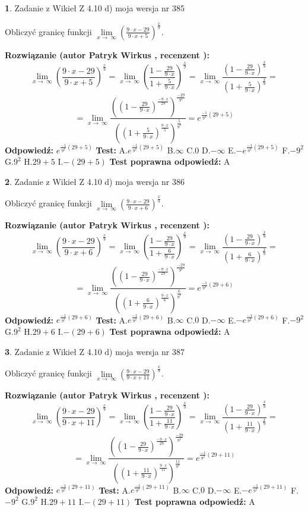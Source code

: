 \documentclass[12pt, a4paper]{article}
\theoremstyle{definition} %
\newtheorem{zad}{}
\newcommand{\zadStart}[1]{\begin{zad}#1\newline}
\newcommand{\zadStop}{\end{zad}}
\newcommand{\rozwStart}[2]{\noindent \textbf{Rozwiązanie (autor #1 , recenzent #2): }\newline}
\newcommand{\rozwStop}{\newline}
\newcommand{\odpStart}{\noindent \textbf{Odpowiedź:}\newline}
\newcommand{\odpStop}{\newline}
\newcommand{\testStart}{\noindent \textbf{Test:}\newline}
\newcommand{\testStop}{\newline}
\newcommand{\kluczStart}{\noindent \textbf{Test poprawna odpowiedź:}\newline}
\newcommand{\kluczStop}{\newline}
\begin{document}
\zadStart{Zadanie z Wikieł Z 4.10 d) moja wersja nr 385}


Obliczyć granicę funkcji  $\lim\limits_{x\to\ \infty}(\frac{9\cdot x-29}{9\cdot x+5})^{\frac{x}{9}}$.
\zadStop
\rozwStart{Patryk Wirkus}{}
$$\lim\limits_{x\to\ \infty}(\frac{9\cdot x-29}{9\cdot x+5})^{\frac{x}{9}} = \lim\limits_{x\to\ \infty}(\frac{1-\frac{29}{9\cdot x}}{1+\frac{5}{9\cdot x}})^{\frac{x}{9}}=\lim\limits_{x\to\ \infty}\frac{(1-\frac{29}{9\cdot x})^{\frac{x}{9}}}{(1+\frac{5}{9\cdot x})^{\frac{x}{9}}}=$$
$$=\lim\limits_{x\to\ \infty}\frac{((1-\frac{29}{9\cdot x})^{\frac{-9\cdot x}{29}})^{\frac{-29}{9^{2}}}}{((1+\frac{5}{9\cdot x})^{\frac{9\cdot x}{5}})^{\frac{5}{9^{2}}}}=e^{\frac{-1}{9^{2}}(29+5)}$$
\rozwStop
\odpStart
$e^{\frac{-1}{9^{2}}(29+5)}$
\odpStop
\testStart
A.$e^{\frac{-1}{9^{2}}(29+5)}$ B.$\infty$ C.$0$ D.$-\infty$ E.$-e^{\frac{-1}{9^{2}}(29+5)}$
F.$-9^{2}$ G.$9^{2}$
H.$29+5$
I.$-(29+5)$
\testStop
\kluczStart
A
\kluczStop



\zadStart{Zadanie z Wikieł Z 4.10 d) moja wersja nr 386}


Obliczyć granicę funkcji  $\lim\limits_{x\to\ \infty}(\frac{9\cdot x-29}{9\cdot x+6})^{\frac{x}{9}}$.
\zadStop
\rozwStart{Patryk Wirkus}{}
$$\lim\limits_{x\to\ \infty}(\frac{9\cdot x-29}{9\cdot x+6})^{\frac{x}{9}} = \lim\limits_{x\to\ \infty}(\frac{1-\frac{29}{9\cdot x}}{1+\frac{6}{9\cdot x}})^{\frac{x}{9}}=\lim\limits_{x\to\ \infty}\frac{(1-\frac{29}{9\cdot x})^{\frac{x}{9}}}{(1+\frac{6}{9\cdot x})^{\frac{x}{9}}}=$$
$$=\lim\limits_{x\to\ \infty}\frac{((1-\frac{29}{9\cdot x})^{\frac{-9\cdot x}{29}})^{\frac{-29}{9^{2}}}}{((1+\frac{6}{9\cdot x})^{\frac{9\cdot x}{6}})^{\frac{6}{9^{2}}}}=e^{\frac{-1}{9^{2}}(29+6)}$$
\rozwStop
\odpStart
$e^{\frac{-1}{9^{2}}(29+6)}$
\odpStop
\testStart
A.$e^{\frac{-1}{9^{2}}(29+6)}$ B.$\infty$ C.$0$ D.$-\infty$ E.$-e^{\frac{-1}{9^{2}}(29+6)}$
F.$-9^{2}$ G.$9^{2}$
H.$29+6$
I.$-(29+6)$
\testStop
\kluczStart
A
\kluczStop



\zadStart{Zadanie z Wikieł Z 4.10 d) moja wersja nr 387}


Obliczyć granicę funkcji  $\lim\limits_{x\to\ \infty}(\frac{9\cdot x-29}{9\cdot x+11})^{\frac{x}{9}}$.
\zadStop
\rozwStart{Patryk Wirkus}{}
$$\lim\limits_{x\to\ \infty}(\frac{9\cdot x-29}{9\cdot x+11})^{\frac{x}{9}} = \lim\limits_{x\to\ \infty}(\frac{1-\frac{29}{9\cdot x}}{1+\frac{11}{9\cdot x}})^{\frac{x}{9}}=\lim\limits_{x\to\ \infty}\frac{(1-\frac{29}{9\cdot x})^{\frac{x}{9}}}{(1+\frac{11}{9\cdot x})^{\frac{x}{9}}}=$$
$$=\lim\limits_{x\to\ \infty}\frac{((1-\frac{29}{9\cdot x})^{\frac{-9\cdot x}{29}})^{\frac{-29}{9^{2}}}}{((1+\frac{11}{9\cdot x})^{\frac{9\cdot x}{11}})^{\frac{11}{9^{2}}}}=e^{\frac{-1}{9^{2}}(29+11)}$$
\rozwStop
\odpStart
$e^{\frac{-1}{9^{2}}(29+11)}$
\odpStop
\testStart
A.$e^{\frac{-1}{9^{2}}(29+11)}$ B.$\infty$ C.$0$ D.$-\infty$ E.$-e^{\frac{-1}{9^{2}}(29+11)}$
F.$-9^{2}$ G.$9^{2}$
H.$29+11$
I.$-(29+11)$
\testStop
\kluczStart
A
\kluczStop
\end{document}
